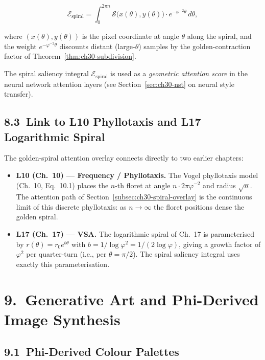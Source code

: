 \[\mathcal{E}_{\text{spiral}} = \int_0^{2\pi n}
  \mathcal{S}\!\bigl(x(\theta), y(\theta)\bigr)
  \cdot e^{-\varphi^{-2}\theta}\,d\theta,\]

where $(x(\theta), y(\theta))$ is the pixel
coordinate at angle $\theta$ along the spiral,
and the weight $e^{-\varphi^{-2}\theta}$ discounts
distant (large-$\theta$) samples by the
golden-contraction factor of
Theorem~\ref{thm:ch30-subdivision}.

The spiral saliency integral $\mathcal{E}_{\text{spiral}}$
is used as a \emph{geometric attention score}
in the neural network attention layers (see
Section~\ref{sec:ch30-nst} on neural style
transfer).

\subsection{8.3\ Link to L10 Phyllotaxis and
  L17 Logarithmic Spiral}\label{subsec:ch30-links}

The golden-spiral attention overlay connects
directly to two earlier chapters:

\begin{itemize}
  \item \textbf{L10 (Ch.~10) --- Frequency /
    Phyllotaxis.}  The Vogel phyllotaxis model
    (Ch.~10, Eq.~10.1) places the $n$-th floret
    at angle $n \cdot 2\pi\varphi^{-2}$ and
    radius $\sqrt{n}$.  The attention path of
    Section~\ref{subsec:ch30-spiral-overlay}
    is the continuous limit of this discrete
    phyllotaxis: as $n \to \infty$ the floret
    positions dense the golden spiral.

  \item \textbf{L17 (Ch.~17) --- VSA.}  The
    logarithmic spiral of Ch.~17 is parameterised
    by $r(\theta) = r_0 e^{b\theta}$ with
    $b = 1/\log\varphi^{2} = 1/(2\log\varphi)$,
    giving a growth factor of $\varphi^2$ per
    quarter-turn (i.e., per $\theta = \pi/2$).
    The spiral saliency integral uses exactly
    this parameterisation.
\end{itemize}

\section{9.\ Generative Art and Phi-Derived
  Image Synthesis}\label{sec:ch30-generative-art}

\subsection{9.1\ Phi-Derived Colour
  Palettes}\label{subsec:ch30-color}

